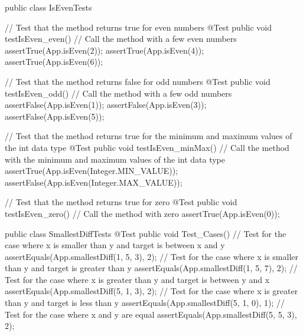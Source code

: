 \documentclass[a4paper]{article}
\begin{document}
    \hspace{-1.7cm}\begin{verbbox}[]

public class IsEvenTests {
  // Test that the method returns true for even numbers
  @Test
  public void testIsEven_even() {
    // Call the method with a few even numbers
    assertTrue(App.isEven(2));
    assertTrue(App.isEven(4));
    assertTrue(App.isEven(6));
  }

  // Test that the method returns false for odd numbers
  @Test
  public void testIsEven_odd() {
    // Call the method with a few odd numbers
    assertFalse(App.isEven(1));
    assertFalse(App.isEven(3));
    assertFalse(App.isEven(5));
  }

  // Test that the method returns true for the minimum and maximum values of the int data type
  @Test
  public void testIsEven_minMax() {
    // Call the method with the minimum and maximum values of the int data type
    assertTrue(App.isEven(Integer.MIN_VALUE));
    assertFalse(App.isEven(Integer.MAX_VALUE));
  }

  // Test that the method returns true for zero
  @Test
  public void testIsEven_zero() {
    // Call the method with zero
    assertTrue(App.isEven(0));
  }
}
    \end{verbbox}
   \theverbbox

    \hspace{-1.7cm}\begin{verbbox}[]
public class SmallestDiffTests {
  @Test
  public void Test_Cases() {
      // Test for the case where x is smaller than y and target is between x and y
      assertEquals(App.smallestDiff(1, 5, 3), 2);
      // Test for the case where x is smaller than y and target is greater than y
      assertEquals(App.smallestDiff(1, 5, 7), 2);
      // Test for the case where x is greater than y and target is between y and x
      assertEquals(App.smallestDiff(5, 1, 3), 2);
      // Test for the case where x is greater than y and target is less than y
      assertEquals(App.smallestDiff(5, 1, 0), 1);
      // Test for the case where x and y are equal
      assertEquals(App.smallestDiff(5, 5, 3), 2);
  }
}
    \end{verbbox}
   \theverbbox
\end{document}
